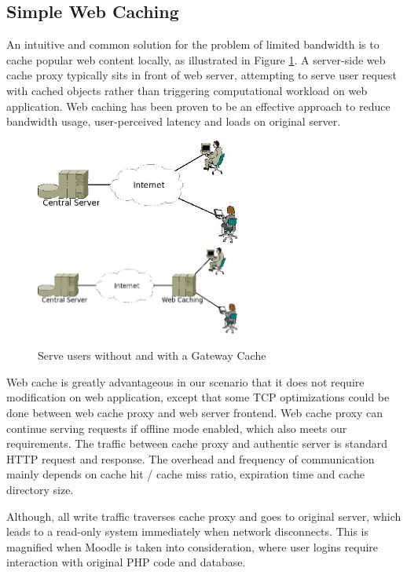 
\subsection{Simple Web Caching}
An intuitive and common solution for the problem of limited bandwidth is to cache popular web content locally, as illustrated in Figure \ref{with_cache}.
A server-side web cache proxy typically sits in front of web server, attempting to serve user request with cached objects rather than triggering computational workload on web application. Web caching has been proven to be an effective approach to reduce bandwidth usage, user-perceived latency and loads on original server\cite{davison2001web}.

\begin{figure}[h]
\centering
\includegraphics[width=0.6\textwidth]{../images/without_caching.jpeg}
\includegraphics[width=0.6\textwidth]{../images/with_caching.jpeg}
\caption{Serve users without and with a Gateway Cache}
\label{with_cache}
\end{figure}

Web cache is greatly advantageous in our scenario that it does not require modification on web application, except that some TCP optimizations could be done between web cache proxy and web server frontend. Web cache proxy can continue serving requests if offline mode enabled, which also meets our requirements. The traffic between cache proxy and authentic server is standard HTTP request and response. The overhead and frequency of communication mainly depends on cache hit / cache miss ratio, expiration time and cache directory size.

Although, all write traffic traverses cache proxy and goes to original server, which leads to a read-only system immediately when network disconnects. This is magnified when Moodle is taken into consideration, where user logins require interaction with original PHP code and database.

